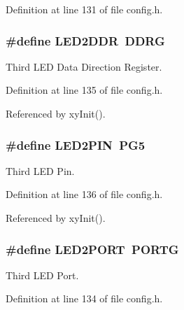 Definition at line 131 of file config.\-h.

\hypertarget{group__config_ga7e635626ee31b094da0a668476132577}{
\subsubsection[{L\-E\-D2\-D\-D\-R}]{\setlength{\rightskip}{0pt plus 5cm}\#define L\-E\-D2\-D\-D\-R~D\-D\-R\-G}}\label{group__config_ga7e635626ee31b094da0a668476132577}


Third L\-E\-D Data Direction Register. 



Definition at line 135 of file config.\-h.



Referenced by xy\-Init().

\hypertarget{group__config_ga50070e632cb68d11f627c5ab60f88683}{
\subsubsection[{L\-E\-D2\-P\-I\-N}]{\setlength{\rightskip}{0pt plus 5cm}\#define L\-E\-D2\-P\-I\-N~P\-G5}}\label{group__config_ga50070e632cb68d11f627c5ab60f88683}


Third L\-E\-D Pin. 



Definition at line 136 of file config.\-h.



Referenced by xy\-Init().

\hypertarget{group__config_ga4b6e8cddebfbc6f1f5132eb93b92d60f}{
\subsubsection[{L\-E\-D2\-P\-O\-R\-T}]{\setlength{\rightskip}{0pt plus 5cm}\#define L\-E\-D2\-P\-O\-R\-T~P\-O\-R\-T\-G}}\label{group__config_ga4b6e8cddebfbc6f1f5132eb93b92d60f}


Third L\-E\-D Port. 



Definition at line 134 of file config.\-h.

